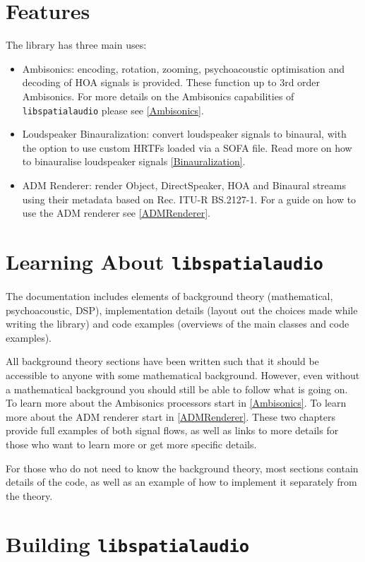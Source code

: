 \documentclass[12pt]{report}
\def\libspataud{\texttt{libspatialaudio}\xspace}
\begin{document}
\section{Features}

The library has three main uses:
\begin{itemize}
    \item Ambisonics: encoding, rotation, zooming, psychoacoustic optimisation and decoding of HOA signals is provided. These function up to 3rd order Ambisonics. For more details on the Ambisonics capabilities of \libspataud please see \cref{Ambisonics}.
    \item Loudspeaker Binauralization: convert loudspeaker signals to binaural, with the option to use custom HRTFs loaded via a SOFA file. Read more on how to binauralise loudspeaker signals \cref{Binauralization}.
    \item ADM Renderer: render Object, DirectSpeaker, HOA and Binaural streams using their metadata based on Rec. ITU-R BS.2127-1. For a guide on how to use the ADM renderer see \cref{ADMRenderer}.
\end{itemize}

\section{Learning About \libspataud}

The documentation includes elements of background theory (mathematical, psychoacoustic, DSP), implementation details (layout out the choices made while writing the library) and code examples (overviews of the main classes and code examples).

All background theory sections have been written such that it should be accessible to anyone with some mathematical background.
However, even without a mathematical background you should still be able to follow what is going on.
To learn more about the Ambisonics processors start in \cref{Ambisonics}.
To learn more about the ADM renderer start in \cref{ADMRenderer}.
These two chapters provide full examples of both signal flows, as well as links to more details for those who want to learn more or get more specific details.

For those who do not need to know the background theory, most sections contain details of the code, as well as an example of how to implement it separately from the theory.

\section{Building \libspataud}
\end{document}
